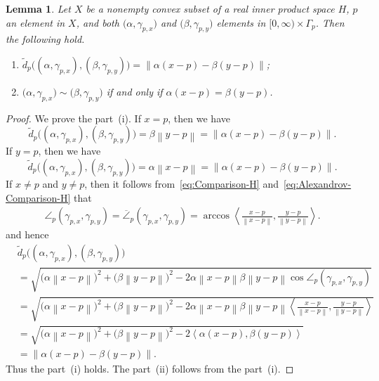 \documentclass[draft]{amsart}
\numberwithin{equation}{section}
\providecommand{\norm}[1]{\left\lVert#1\right\rVert}
\newcommand{\ip}[2]{\left\langle #1, #2 \right\rangle}
\theoremstyle{plain}
\newtheorem{lemma}[theorem]{Lemma}
\theoremstyle{definition}
\theoremstyle{remark}
\begin{document}
\begin{lemma}\label{lem:character-equiv-Y-H}
 Let $X$ be a nonempty convex subset of a real inner product space $H$, $p$ an element in $X$, 
 and both $\bigl(\alpha, \gamma_{p, x}\bigr)$ and 
 $\bigl(\beta, \gamma_{p, y}\bigr)$ elements 
 in $[0,\infty)\times \Gamma_p$. 
 Then the following hold. 
 \begin{enumerate}
  \item[(i)]
 $\tilde{d}_p\bigl((\alpha, \gamma_{p, x}), (\beta, \gamma_{p, y})\bigr) =\norm{\alpha(x-p)-\beta(y-p)}$; 
  \item[(ii)]
 $\bigl(\alpha, \gamma_{p, x}\bigr) \sim 
 \bigl(\beta, \gamma_{p, y}\bigr)$ if and only if 
 $\alpha(x-p)=\beta(y-p)$. 
 \end{enumerate}
\end{lemma}

\begin{proof}
 We prove the part~(i). 
 If $x=p$, then we have 
 \[
 \tilde{d}_{p} 
 \bigl((\alpha, \gamma_{p, x}), (\beta, \gamma_{p, y})\bigr) 
 = \beta \norm{y-p} 
 =\norm{\alpha(x-p)-\beta(y-p)}. 
 \]
 If $y=p$, then we have 
 \[
 \tilde{d}_{p} 
 \bigl((\alpha, \gamma_{p, x}), (\beta, \gamma_{p, y})\bigr) 
 = \alpha \norm{x-p} 
 =\norm{\alpha(x-p)-\beta(y-p)}. 
 \]
 If $x\neq p$ and $y\neq p$, 
 then it follows from~\eqref{eq:Comparison-H} 
 and~\eqref{eq:Alexandrov-Comparison-H} that 
 \begin{align*}
  \angle_p (\gamma_{p,x}, \gamma_{p,y})
  =\overline{\angle}_p (\gamma_{p,x}, \gamma_{p,y}) 
  = \arccos \ip{
  \frac{x-p}{\norm{x-p}}
 }{
 \frac{y-p}{\norm{y-p}}
 }. 
 \end{align*}
 and hence 
 \begin{align*}
 &\tilde{d}_{p} 
 \bigl((\alpha, \gamma_{p, x}), (\beta, \gamma_{p, y})\bigr) \\
 &= \sqrt{
 \bigl(\alpha \norm{x-p}\bigr)^2 
 +\bigl(\beta \norm{y-p}\bigr)^2 
 -2\alpha \norm{x-p} \beta \norm{y-p} 
 \cos \angle_p (\gamma_{p,x}, \gamma_{p,y})
 } \\
 &= \sqrt{
 \bigl(\alpha \norm{x-p}\bigr)^2 
 +\bigl(\beta \norm{y-p}\bigr)^2 
 -2\alpha \norm{x-p} \beta \norm{y-p} 
 \ip{
  \frac{x-p}{\norm{x-p}}
 }{
 \frac{y-p}{\norm{y-p}}
 }
 } \\
 &= \sqrt{
 \bigl(\alpha \norm{x-p}\bigr)^2 
 +\bigl(\beta \norm{y-p}\bigr)^2 
 -2
 \ip{\alpha(x-p)}{\beta(y-p)}
 } \\ 
 &= \norm{\alpha(x-p)-\beta(y-p)}. 
 \end{align*} 
 Thus the part~(i) holds. The part~(ii) follows from the part~(i). 
\end{proof}
\end{document}
